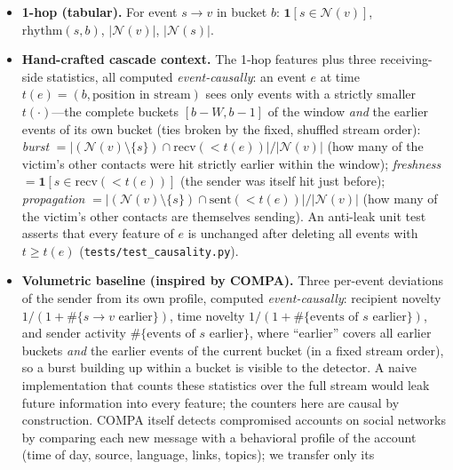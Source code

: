 \documentclass[a4paper,11pt]{article}
\begin{document}
\begin{itemize}
  \item \textbf{1-hop (tabular).} For event $s\!\to\!v$ in bucket $b$: $\mathbf{1}[s\in\mathcal{N}(v)]$,
  $\mathrm{rhythm}(s,b)$, $|\mathcal{N}(v)|$, $|\mathcal{N}(s)|$.
  \item \textbf{Hand-crafted cascade context.} The 1-hop features plus three receiving-side statistics,
  all computed \emph{event-causally}: an event $e$ at time $t(e)=(b,\text{position in stream})$ sees
  only events with a strictly smaller $t(\cdot)$---the complete buckets $[b-W, b-1]$ of the window
  \emph{and} the earlier events of its own bucket (ties broken by the fixed, shuffled stream order):
  \emph{burst} $=|(\mathcal{N}(v)\setminus\{s\})\cap\mathrm{recv}(<t(e))|/|\mathcal{N}(v)|$
  (how many of the victim's other contacts were hit strictly earlier within the window); \emph{freshness}
  $=\mathbf{1}[s\in\mathrm{recv}(<t(e))]$ (the sender was itself hit just before);
  \emph{propagation} $=|(\mathcal{N}(v)\setminus\{s\})\cap\mathrm{sent}(<t(e))|/|\mathcal{N}(v)|$
  (how many of the victim's other contacts are themselves sending). An anti-leak unit test asserts that
  every feature of $e$ is unchanged after deleting all events with $t\ge t(e)$
  (\texttt{tests/test\_causality.py}).
  \item \textbf{Volumetric baseline (inspired by COMPA).} Three per-event deviations of the sender from its own
  profile, computed \emph{event-causally}: recipient novelty $1/(1+\#\{s\!\to\!v \text{ earlier}\})$, time novelty
  $1/(1+\#\{\text{events of } s \text{ earlier}\})$, and sender activity $\#\{\text{events of } s \text{ earlier}\}$,
  where ``earlier'' covers all earlier buckets \emph{and} the earlier events of the current bucket (in a fixed
  stream order), so a burst building up within a bucket is visible to the detector. A naive implementation that
  counts these statistics over the full stream would leak future information into every feature; the
  counters here are causal by construction. COMPA
  itself detects compromised accounts on social networks by comparing each new message with a behavioral
  profile of the account (time of day, source, language, links, topics); we transfer only its

\end{itemize}
\end{document}
